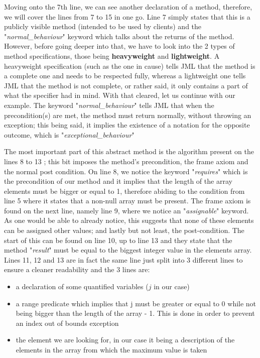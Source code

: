 \documentclass{article}
\begin{document}
Moving onto the 7th line, we can see another declaration of a method, therefore, we will cover the lines from 7 to 15 in one go. Line 7 simply states that this is a publicly visible method (intended to be used by clients) and the "\textit{normal\_behaviour}" keyword which talks about the returns of the method. However, before going deeper into that, we have to look into the 2 types of method specifications, those being \textbf{heavyweight} and \textbf{lightweight}. A heavyweight specification (such as the one in cause) tells JML that the method is a complete one and needs to be respected fully, whereas a lightweight one tells JML that the method is not complete, or rather said, it only contains a part of what the specifier had in mind. With that cleared, let us continue with our example. The keyword "\textit{normal\_behaviour}" tells JML that when the precondition(s) are met, the method must return normally, without throwing an exception; this being said, it implies the existence of a notation for the opposite outcome, which is "\textit{exceptional\_behaviour}" 

The most important part of this abstract method is the algorithm present on the lines 8 to 13 \cite{leavens2008jml}; this bit imposes the method's precondition, the frame axiom and the normal post condition. On line 8, we notice the keyword "\textit{requires}" which is the precondition of our method and it implies that the length of the array elements must be bigger or equal to 1, therefore abiding to the condition from line 5 where it states that a non-null array must be present. The frame axiom is found on the next line, namely line 9, where we notice an "\textit{assignable}" keyword. As one would be able to already notice, this suggests that none of these elements can be assigned other values; and lastly but not least, the post-condition. The start of this can be found on line 10, up to line 13 and they state that the method "\textit{result}" must be equal to the biggest integer value in the elements array. Lines 11, 12 and 13 are in fact the same line just split into 3 different lines to ensure a cleaner readability and the 3 lines are: 
\begin{itemize}
    \item a declaration of some quantified variables ($j$ in our case)
    \item a range predicate which implies that j must be greater or equal to 0 while not being bigger than the length of the array - 1. This is done in order to prevent an index out of bounds exception
    \item the element we are looking for, in our case it being a description of the elements in the array from which the maximum value is taken
\end{itemize}
\end{document}
